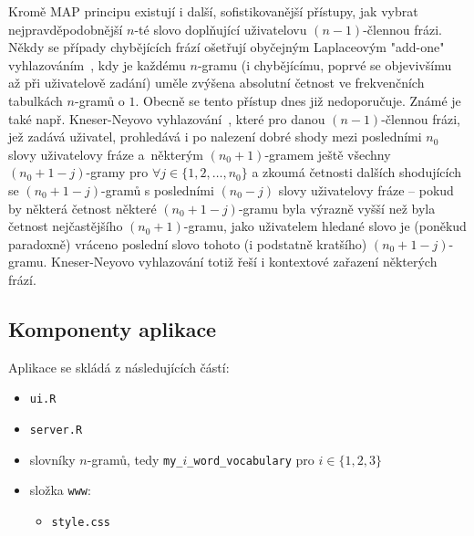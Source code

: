 Kromě MAP principu
existují i další, sofistikovanější přístupy, jak vybrat
nejpravděpodobnější $n$-té slovo doplňující uživatelovu $(n - 1)$-člennou
frázi. Někdy se případy chybějících frází ošetřují obyčejným
Laplaceovým
"add-one" vyhlazováním~\cite{Chen1996}, kdy je každému $n$-gramu%
(i chybějícímu, poprvé se objevivšímu až při uživatelově zadání) uměle
zvýšena absolutní četnost ve frekvenčních tabulkách $n$-gramů o $1$.
Obecně se tento přístup dnes již nedoporučuje. Známé je také
např. Kneser-Neyovo vyhlazování~\cite{Jurafsky2009},
které pro danou $(n - 1)$-člennou frázi,
jež zadává uživatel, prohledává
i po nalezení dobré shody mezi posledními $n_{0}$ slovy uživatelovy fráze
a~některým $(n_{0} + 1)$-gramem ještě všechny $(n_{0} + 1 - j)$-gramy pro
$\forall j \in \{1, 2, \ldots, n_{0}\}$ a zkoumá četnosti dalších shodujících
se $(n_{0} + 1 - j)$-gramů s posledními $(n_{0} - j)$ slovy uživatelovy
fráze -- pokud by některá četnost některé $(n_{0} + 1 - j)$-gramu byla
výrazně vyšší než byla četnost nejčastějšího $(n_{0} + 1)$-gramu,
jako uživatelem hledané slovo je (poněkud paradoxně) vráceno poslední
slovo tohoto (i podstatně kratšího) $(n_{0} + 1 - j)$-gramu. Kneser-Neyovo
vyhlazování totiž řeší
i kontextové zařazení některých frází.


\subsection{Komponenty aplikace}

Aplikace se skládá z následujících částí:

\begin{itemize}
  \item \texttt{ui.R}
  \item \texttt{server.R}
  \item slovníky $n$-gramů, tedy \texttt{my\_$i$\_word\_vocabulary}
        pro $i \in \{1, 2, 3\}$
  \item složka \texttt{www}:
  \begin{itemize}
    \item \texttt{style.css}
  \end{itemize}
\end{itemize}


